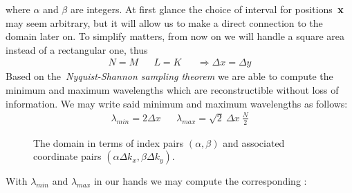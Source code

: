 where $\alpha$ and $\beta$ are integers. At first glance the choice of interval
for positions~$\mathbf{x}$ may seem arbitrary, but it will allow us to make a
direct connection to the \wavevector domain later on.
To simplify matters, from now on we will handle a square area instead of a
rectangular one, thus
\begin{align}
\label{eq:square_area}
 N = M && L = K &&\Rightarrow \Delta x = \Delta y
\end{align}
%
Based on the~\emph{Nyquist-Shannon sampling
theorem}\cite{book:bracewell2000fourier} we are able to compute the minimum and
maximum wavelengths which are reconstructible without loss of information.
We may write said minimum and maximum wavelengths as follows:
\begin{align}
 \lambda_{min} = 2\Delta x && \lambda_{max} = \sqrt{2}~\Delta x~\frac{N}{2}
\end{align}
%
\begin{figure}
\centering
{}
\caption{The \wavevector domain in terms of index pairs $(\alpha,\beta)$ and
associated coordinate pairs $(\alpha\Delta k_x,\beta\Delta k_y)$.}
\label{fig:wave_vector_domain}
\end{figure}
%
With $\lambda_{min}$ and $\lambda_{max}$ in our hands we may compute the
corresponding \wavenumbers:
